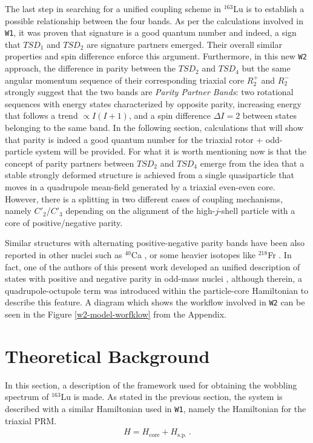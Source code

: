 \documentclass[11pt]{article}
\begin{document}
The last step in searching for a unified coupling scheme in $^{163}$Lu is to establish a possible relationship between the four bands. As per the calculations involved in \texttt{W1}, it was proven that signature is a good quantum number and indeed, a sign that $TSD_1$ and $TSD_2$ are signature partners emerged. Their overall similar properties and spin difference enforce this argument. Furthermore, in this new \texttt{W2} approach, the difference in parity between the $TSD_2$ and $TSD_4$ but the same angular momentum sequence of their corresponding triaxial core $R_2^+$ and $R_2^-$ strongly suggest that the two bands are \emph{Parity Partner Bands}: two rotational sequences with energy states characterized by opposite parity, increasing energy that follows a trend $\propto I(I+1)$, and a spin difference $\Delta I=2$ between states belonging to the same band. In the following section, calculations that will show that parity is indeed a good quantum number for the triaxial rotor + odd-particle system will be provided. For what it is worth mentioning now is that the concept of parity partners between $TSD_2$ and $TSD_4$ emerge from the idea that a stable strongly deformed structure is achieved from a single quasiparticle that moves in a quadrupole mean-field generated by a triaxial even-even core. However, there is a splitting in two different cases of coupling mechanisms, namely $C'_2$/$C'_3$ depending on the alignment of the high-$j$-shell particle with a core of positive/negative parity.

Similar structures with alternating positive-negative parity bands have been also reported in other nuclei such as $^{40}$Ca \cite{torilov2004spectroscopy}, or some heavier isotopes like $^{218}$Fr \cite{debray2000alternating}. In fact, one of the authors of this present work developed an unified description of states with positive and negative parity in odd-mass nuclei \cite{radutaa2009csm,raduta2011simultaneous}, although therein, a quadrupole-octupole term was introduced within the particle-core Hamiltonian to describe this feature. A diagram which shows the workflow involved in \texttt{W2} can be seen in the Figure \ref{w2-model-worfklow} from the Appendix.

\section{Theoretical Background}

In this section, a description of the framework used for obtaining the wobbling spectrum of $^{163}$Lu is made. As stated in the previous section, the system is described with a similar Hamiltonian used in \texttt{W1}, namely the Hamiltonian for the triaxial PRM.
\begin{align}
    H=H_\text{core}+H_\text{s.p.}\ .
    \label{prm-hamiltonian}
\end{align}
\end{document}
